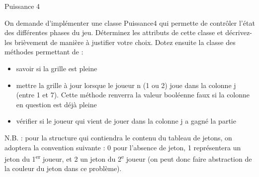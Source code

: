 \begin{Exercice}{Puissance 4}
	
	On demande d’implémenter une classe Puissance4 qui permette de contrôler
	l’état des différentes phases du jeu. Déterminez les attributs de cette
	classe et décrivez-les brièvement de manière à justifier votre choix.
	Dotez ensuite la classe des méthodes permettant de :

	\begin{itemize}
		\item 
			savoir si la grille est pleine
		\item 
			mettre la grille à jour lorsque le joueur n (1 ou 2) joue dans la
			colonne j (entre 1 et 7). Cette méthode renverra la valeur booléenne
			faux si la colonne en question est déjà pleine
		\item 
			vérifier si le joueur qui vient de jouer dans la colonne j a gagné la
			partie
	\end{itemize}
	
	N.B. : pour la structure qui contiendra le contenu du tableau de jetons,
	on adoptera la convention suivante : 0 pour l’absence de jeton, 1
	représentera un jeton du 1\textsuperscript{er} joueur, et 2 un jeton du
	2\textsuperscript{e} joueur (on peut donc faire abstraction de la
	couleur du jeton dans ce problème).
\end{Exercice}

